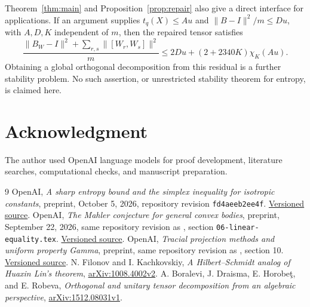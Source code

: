 \documentclass[11pt,reqno]{amsart}
\numberwithin{equation}{section}
\theoremstyle{remark}
\begin{document}
Theorem~\ref{thm:main} and Proposition~\ref{prop:repair} also give a
direct interface for applications. If an argument supplies
$t_q(X)\le Au$ and $\|B-I\|^2/m\le Du$, with $A,D,K$ independent of
$m$, then the repaired tensor satisfies
\[
 \frac{\|B_W-I\|^2+\sum_{r,s}\|[W_r,W_s]\|^2}{m}
 \le2Du+(2+2340K)\chi_K(Au).
\]
Obtaining a global orthogonal decomposition from this residual is a
further stability problem. No such assertion, or unrestricted
stability theorem for entropy, is claimed here.

\section*{Acknowledgment}
The author used OpenAI language models for proof development, literature
searches, computational checks, and manuscript preparation.

\begin{thebibliography}{9}
 OpenAI, \emph{A sharp entropy bound and the simplex inequality
for isotropic constants}, preprint, October 5, 2026, repository revision
\texttt{fd4aeeb2ee4f}.
\href{https://github.com/openai/math/tree/fd4aeeb2ee4fc729c18d98444fed42fd0529eeeb/preprints/A-sharp-entropy-bound-and-the-simplex-inequality-for-isotropic-constants-October-5-2026}{Versioned source}.
 OpenAI, \emph{The Mahler conjecture for general convex bodies},
preprint, September 22, 2026, same repository revision as \cite{Entropy},
section \texttt{06-linear-equality.tex}.
\href{https://github.com/openai/math/tree/fd4aeeb2ee4fc729c18d98444fed42fd0529eeeb/preprints/The-Mahler-Conjecture-for-General-Convex-Bodies-September-22-2026}{Versioned source}.
 OpenAI, \emph{Tracial projection methods and uniform property
Gamma}, preprint, same repository revision as \cite{Entropy}, section 10.
\href{https://github.com/openai/math/tree/fd4aeeb2ee4fc729c18d98444fed42fd0529eeeb/preprints/Tracial-projection-methods-and-uniform-property-Gamma-September-23-2026}{Versioned source}.
 N. Filonov and I. Kachkovskiy,
\emph{A Hilbert--Schmidt analog of Huaxin Lin's theorem},
\href{https://arxiv.org/abs/1008.4002v2}{arXiv:1008.4002v2}.
 A. Boralevi, J. Draisma, E. Horobe\c{t}, and E. Robeva,
\emph{Orthogonal and unitary tensor decomposition from an algebraic perspective},
\href{https://arxiv.org/abs/1512.08031v1}{arXiv:1512.08031v1}.
\end{thebibliography}
\end{document}
